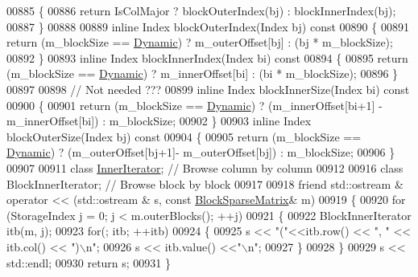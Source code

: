 \begin{DoxyCode}
00885 \textcolor{keyword}{    }\{
00886       \textcolor{keywordflow}{return} IsColMajor ? blockOuterIndex(bj) : blockInnerIndex(bj);
00887     \}
00888 
00889     \textcolor{keyword}{inline} Index blockOuterIndex(Index bj)\textcolor{keyword}{ const}
00890 \textcolor{keyword}{    }\{
00891       \textcolor{keywordflow}{return} (m\_blockSize == \hyperlink{namespace_eigen_ad81fa7195215a0ce30017dfac309f0b2}{Dynamic}) ? m\_outerOffset[bj] : (bj * m\_blockSize);
00892     \}
00893     \textcolor{keyword}{inline} Index blockInnerIndex(Index bi)\textcolor{keyword}{ const}
00894 \textcolor{keyword}{    }\{
00895       \textcolor{keywordflow}{return} (m\_blockSize == \hyperlink{namespace_eigen_ad81fa7195215a0ce30017dfac309f0b2}{Dynamic}) ? m\_innerOffset[bi] : (bi * m\_blockSize);
00896     \}
00897 
00898     \textcolor{comment}{// Not needed ???}
00899     \textcolor{keyword}{inline} Index blockInnerSize(Index bi)\textcolor{keyword}{ const}
00900 \textcolor{keyword}{    }\{
00901       \textcolor{keywordflow}{return} (m\_blockSize == \hyperlink{namespace_eigen_ad81fa7195215a0ce30017dfac309f0b2}{Dynamic}) ? (m\_innerOffset[bi+1] - m\_innerOffset[bi]) : m\_blockSize;
00902     \}
00903     \textcolor{keyword}{inline} Index blockOuterSize(Index bj)\textcolor{keyword}{ const}
00904 \textcolor{keyword}{    }\{
00905       \textcolor{keywordflow}{return} (m\_blockSize == \hyperlink{namespace_eigen_ad81fa7195215a0ce30017dfac309f0b2}{Dynamic}) ? (m\_outerOffset[bj+1]- m\_outerOffset[bj]) : m\_blockSize;
00906     \}
00907 
00911     \textcolor{keyword}{class }\hyperlink{class_eigen_1_1_inner_iterator}{InnerIterator}; \textcolor{comment}{// Browse column by column}
00912 
00916     \textcolor{keyword}{class }BlockInnerIterator; \textcolor{comment}{// Browse block by block}
00917 
00918     \textcolor{keyword}{friend} std::ostream & operator << (std::ostream & s, \textcolor{keyword}{const} \hyperlink{group___sparse_core___module_class_eigen_1_1_block_sparse_matrix}{BlockSparseMatrix}& m)
00919     \{
00920       \textcolor{keywordflow}{for} (StorageIndex j = 0; j < m.outerBlocks(); ++j)
00921       \{
00922         BlockInnerIterator itb(m, j);
00923         \textcolor{keywordflow}{for}(; itb; ++itb)
00924         \{
00925           s << \textcolor{stringliteral}{"("}<<itb.row() << \textcolor{stringliteral}{", "} << itb.col() << \textcolor{stringliteral}{")\(\backslash\)n"};
00926           s << itb.value() <<\textcolor{stringliteral}{"\(\backslash\)n"};
00927         \}
00928       \}
00929       s << std::endl;
00930       \textcolor{keywordflow}{return} s;
00931     \}

\end{DoxyCode}
